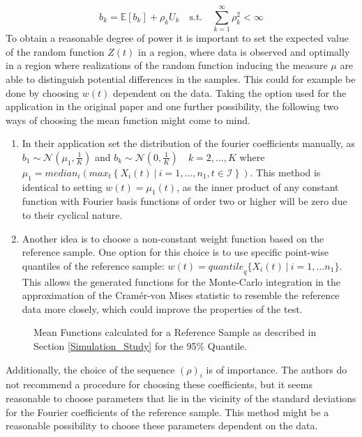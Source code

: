 \documentclass[12pt, a4paper]{article}
\theoremstyle{MAstyle} \newtheorem{assumption}{Assumption}[section]
\theoremstyle{MAstyle} \newtheorem{definition}{Definition}[section]
\theoremstyle{MAstyle} \newtheorem{theorem}{Theorem}[section]
\begin{document}
			\begin{equation}\label{Fourier_coefs}
				b_k = \mathbb{E}\left[b_k\right] + \rho_k U_k
				\quad \text{s.t.} \quad
				\sum_{k = 1}^{\infty} \rho_k^2 < \infty 
			\end{equation}
			To obtain a reasonable degree of power it is important to set the expected value of the random function $Z(t)$ in a region, where data is observed and optimally in a region where realizations of the random function inducing the measure $\mu$ are able to distinguish potential differences in the samples. This could for example be done by choosing $w(t)$ dependent on the data. Taking the option used for the application in the original paper and one further possibility, the following two ways of choosing the mean function might come to mind.
			
			\begin{enumerate}
				\item In their application \cite{bugni_permutation_2021} set the distribution of the fourier coefficients manually, as $b_1 \sim \mathcal{N}(\mu_1, \frac{1}{K})$ and $b_k \sim \mathcal{N}(0, \frac{1}{K}) \quad k = 2, \dots, K$ where $\mu_1 = \textit{median}_i \left(\textit{max}_t\left\{X_i(t) \ | \ i = 1, \dots, n_1, t\in \mathcal{I}\right\}\right)$.
				This method is identical to setting $w(t) = \mu_1(t)$, as the inner product of any constant function with Fourier basis functions of order two or higher will be zero due to their cyclical nature.
				\item Another idea is to choose a non-constant weight function based on the reference sample. One option for this choice is to use specific point-wise quantiles of the reference sample: $w(t) = \textit{quantile}_q \{X_i(t) \ | \ i = 1, \dots n_1\}$. This allows the generated functions for the Monte-Carlo integration in the approximation of the Cram\'{e}r-von Mises statistic to resemble the reference data more closely, which could improve the properties of the test.
			\end{enumerate}
		
			\begin{figure}[H]
				\caption{Mean Functions calculated for a Reference Sample as described in Section \ref{Simulation_Study} for the 95\% Quantile.}
				\label{mean_functions}
			\end{figure}
			
			
			Additionally, the choice of the sequence $(\rho)_i$ is of importance. The authors do not recommend a procedure for choosing these coefficients, but it seems reasonable to choose parameters that lie in the vicinity of the standard deviations for the Fourier coefficients of the reference sample. This method might be a reasonable possibility to choose these parameters dependent on the data.\\
			
\end{document}
